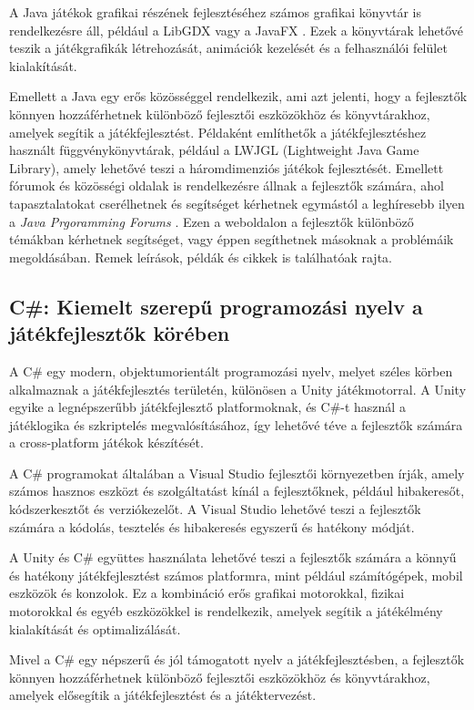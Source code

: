 A Java játékok grafikai részének fejlesztéséhez számos grafikai könyvtár is rendelkezésre áll, például a LibGDX \cite{libgdx} vagy a JavaFX \cite{javafx}. Ezek a könyvtárak lehetővé teszik a játékgrafikák létrehozását, animációk kezelését és a felhasználói felület kialakítását.

Emellett a Java egy erős közösséggel rendelkezik, ami azt jelenti, hogy a fejlesztők könnyen hozzáférhetnek különböző fejlesztői eszközökhöz és könyvtárakhoz, amelyek segítik a játékfejlesztést. Példaként említhetők a játékfejlesztéshez használt függvénykönyvtárak, például a LWJGL (Lightweight Java Game Library), amely lehetővé teszi a háromdimenziós játékok fejlesztését. Emellett fórumok és közösségi oldalak is rendelkezésre állnak a fejlesztők számára, ahol tapasztalatokat cserélhetnek és segítséget kérhetnek egymástól a leghíresebb ilyen a \textsl{Java Prgoramming Forums} \cite{JPF}. Ezen a weboldalon a fejlesztők különböző témákban kérhetnek segítséget, vagy éppen segíthetnek másoknak a problémáik megoldásában. Remek leírások, példák és cikkek is találhatóak rajta.
\subsection{C\#: Kiemelt szerepű programozási nyelv a játékfejlesztők körében}

\indent \indent A C\# \cite{csharp-doc} egy modern, objektumorientált programozási nyelv, melyet széles körben alkalmaznak a játékfejlesztés területén, különösen a Unity játékmotorral. \cite{unity-cs} A Unity egyike a legnépszerűbb játékfejlesztő platformoknak, és C\#-t használ a játéklogika és szkriptelés megvalósításához, így lehetővé téve a fejlesztők számára a cross-platform játékok készítését.

A C\# programokat általában a Visual Studio\cite{vs} fejlesztői környezetben írják, amely számos hasznos eszközt és szolgáltatást kínál a fejlesztőknek, például hibakeresőt, kódszerkesztőt és verziókezelőt. A Visual Studio lehetővé teszi a fejlesztők számára a kódolás, tesztelés és hibakeresés egyszerű és hatékony módját.

A Unity és C\# együttes használata lehetővé teszi a fejlesztők számára a könnyű és hatékony játékfejlesztést számos platformra, mint például számítógépek, mobil eszközök és konzolok. Ez a kombináció erős grafikai motorokkal, fizikai motorokkal és egyéb eszközökkel is rendelkezik, amelyek segítik a játékélmény kialakítását és optimalizálását.

Mivel a C\# egy népszerű és jól támogatott nyelv a játékfejlesztésben, a fejlesztők könnyen hozzáférhetnek különböző fejlesztői eszközökhöz és könyvtárakhoz, amelyek elősegítik a játékfejlesztést és a játéktervezést.
